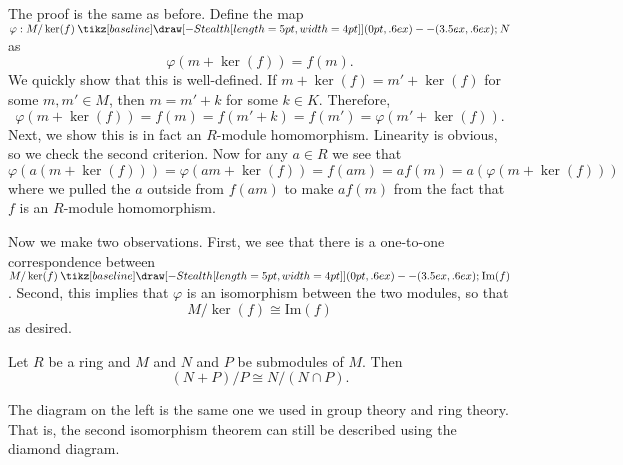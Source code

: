 \documentclass[12pt,letterpaper]{algebra_book}
\renewcommand{\to}{\mathbin{\tikz[baseline] \draw[-{Stealth[length=5pt,width=4pt]}] (0pt,.6ex) -- (3.5ex,.6ex);}}
\newcommand{\im}{\mbox{Im}}
\renewcommand{\phi}{\varphi}
\theoremstyle{definition}
\begin{document}
\begin{prf}
    The proof is the same as before. Define the map $\phi:
    M/\ker(f) \to N$ as 
    \[ 
        \phi(m + \ker(f)) = f(m).
    \]
    \textcolor{NavyBlue}{We quickly show that this is well-defined.} If $m + \ker(f) =
    m' + \ker(f)$ for some $m, m' \in M$, then $m = m' + k$ for
    some $k \in K$. Therefore, 
    \[
        \phi(m + \ker(f)) = f(m) = f(m' + k) = f(m') = \phi(m' + \ker(f)).
    \]
    \textcolor{NavyBlue}{Next, we show this is in fact an $R$-module homomorphism.}
    Linearity is obvious, so we check the second criterion. Now
    for any $a \in R$ we see that 
    \[
        \phi(a(m + \ker(f))) = \phi(am + \ker(f)) = f(am) = af(m) = a(\phi(m + \ker(f)))
    \]
    where we pulled the $a$ outside from $f(am)$ to make $af(m)$
    from the fact that $f$ is an $R$-module homomorphism. 

    \textcolor{NavyBlue}{Now we make two observations.} First, we
    see that there is a one-to-one correspondence between
    $M/\ker(f) \to \im(f)$. Second, this implies that $\phi$ is an
    isomorphism between the two modules, so that 
    \[
        M/\ker(f) \cong \im(f)
    \]
    as desired.
\end{prf}

\begin{thm}
    Let $R$ be a ring and $M$ and $N$ and $P$ be submodules of
    $M$. Then 
    \[
        (N + P)/P \cong N/(N \cap P).
    \]
    \vspace{-0.8cm}
\end{thm}

\begin{minipage}{0.35 \textwidth}
    \begin{figure}[H]
    \end{figure}
\end{minipage} \hfill
\begin{minipage}{0.6\textwidth}
    The diagram on the left is the same one we used in group
    theory and ring theory. That is, the second isomorphism
    theorem can still be described using the diamond diagram. 
\end{minipage}  
\end{document}
